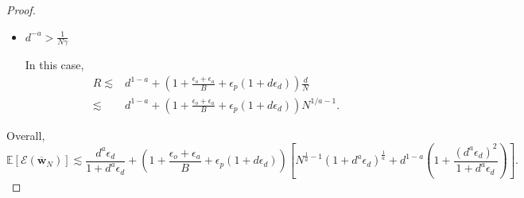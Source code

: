 \documentclass[11pt, letterpaper]{article}
\begin{document}
\begin{proof}
\begin{itemize}[leftmargin=*,nosep]
        In this case, $\frac{1}{N\gamma}-d^{-a}\epsilon_d'<d^{-a}$, that is, $d^{a}<N\gamma(1+\epsilon_d')$. Consequently,
        \begin{equation*}
            \begin{aligned}
                R\lesssim&(N\gamma)^{1/a-1}+\left(1+\frac{\epsilon_o+\epsilon_a}{B}+\epsilon_p(1+d\epsilon_d)\right)\frac{d}{N}\\
                \lesssim&(N\gamma)^{1/a-1}+\left(1+\frac{\epsilon_o+\epsilon_a}{B}+\epsilon_p(1+d\epsilon_d)\right)(1+\epsilon_d')^{1/a}N^{1/a-1}\\
                \lesssim&\left(1+\frac{\epsilon_o+\epsilon_a}{B}+\epsilon_p(1+d\epsilon_d)\right)(1+d^a\epsilon_d)^{1/a}N^{1/a-1}.
            \end{aligned}
        \end{equation*}
        \item $d^{-a}>\frac{1}{N\gamma}$

        In this case,
        \begin{equation*}
            \begin{aligned}
                R\lesssim&d^{1-a}+\left(1+\frac{\epsilon_o+\epsilon_a}{B}+\epsilon_p(1+d\epsilon_d)\right)\frac{d}{N}\\
                \lesssim&d^{1-a}+\left(1+\frac{\epsilon_o+\epsilon_a}{B}+\epsilon_p(1+d\epsilon_d)\right)N^{1/a-1}.
            \end{aligned}
        \end{equation*}
    \end{itemize}
    Overall,
    \begin{equation*}
        \mathbb{E}[\mathcal{E}(\overline{\mathbf{w}}_N)]\lesssim \frac{d^a\epsilon_d}{1+d^a\epsilon_d}+\left(1+\frac{\epsilon_o+\epsilon_a}{B}+\epsilon_p(1+d\epsilon_d)\right)\left[N^{\frac{1}{a}-1}(1+d^a\epsilon_d)^{\frac{1}{a}}+d^{1-a}\left(1+\frac{(d^a\epsilon_d)^2}{1+d^a\epsilon_d}\right)\right].
    \end{equation*}
\end{proof}
\end{document}
